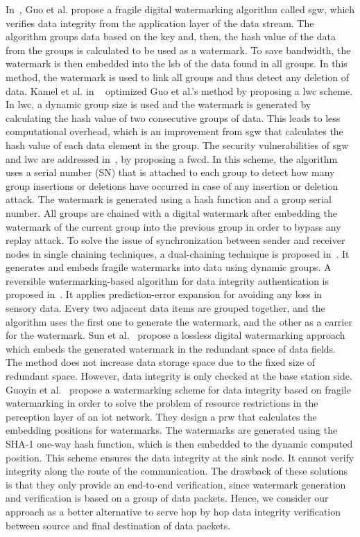 \documentclass{llncs}
\begin{document}
In~\cite{Guo2007}, Guo et al.  propose a fragile digital watermarking algorithm called \gls*{sgw}, which verifies data integrity from the application layer of the data stream. The algorithm groups data based on the key and, then, the hash value of the data from the groups is calculated to be used as a watermark. To save bandwidth, the watermark is then embedded into the \gls*{lsb} of the data found in all groups. In this method, the watermark is used to link all groups and thus detect any deletion of data. Kamel et al. in ~\cite{Kamel2010} optimized Guo et al.'s method by proposing a \gls*{lwc} scheme. In \gls*{lwc}, a dynamic group size is used and the watermark is generated by calculating the hash value of two consecutive groups of data. This leads to less computational overhead, which is an improvement from \gls*{sgw} that calculates the hash value of each data element in the group. The security vulnerabilities of \gls*{sgw} and \gls*{lwc} are addressed in~\cite{Kamel2011}, by proposing a \gls*{fwcd}. In this scheme, the algorithm uses a serial number (SN) that is attached to each group to detect how many group insertions or deletions have occurred in case of any insertion or deletion attack. The watermark is generated using a hash function and a group serial number. All groups are chained with a digital watermark after embedding the watermark of the current group into the previous group in order to bypass any replay attack. To solve the issue of synchronization between sender and receiver nodes in single chaining techniques, a dual-chaining technique is proposed in~\cite{Wang2019}. It generates and embeds fragile watermarks into data using dynamic groups. A reversible watermarking-based algorithm for data integrity authentication is proposed in~\cite{Shi2013}. It applies prediction-error expansion for avoiding any loss in sensory data. Every two adjacent data items are grouped together, and the algorithm uses the first one to generate the watermark, and the other as a carrier for the watermark. Sun et al.~\cite{Sun2013} propose a lossless digital watermarking approach which embeds the generated watermark in the redundant space of data fields. The method does not increase data storage space due to the fixed size of redundant space. However, data integrity is only checked at the base station side. Guoyin et al.~\cite{Zhang2017} propose a watermarking scheme for data integrity based on fragile watermarking in order to solve the problem of resource restrictions in the perception layer of an \gls*{iot} network. They design a \gls*{prw} that calculates the embedding positions for watermarks. The watermarks are generated using the SHA-1 one-way hash function, which is then embedded to the dynamic computed position. This scheme ensures the data integrity at the sink node. It cannot verify integrity along the route of the communication. The drawback of these solutions is that they only provide an end-to-end verification, since watermark generation and verification is based on a group of data packets. Hence, we consider our approach as a better alternative to serve hop by hop data integrity verification between source and final destination of data packets.
\end{document}

